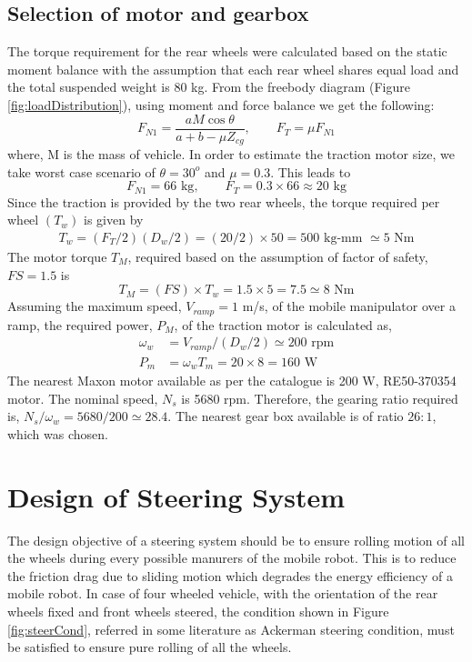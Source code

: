  \subsection {Selection of motor and gearbox}
 The torque requirement for the rear wheels were calculated based on the static moment balance with the assumption that each rear wheel shares equal load and the total suspended weight is 80 kg. From the freebody diagram (Figure   \ref{fig:loadDistribution}), using moment and force balance  we get the following:
\begin{equation}
\label{eqn:t1}
F_{N1}=\frac{a M \cos \theta}{a+b-\mu Z_{cg}} , \quad \quad
F_T=\mu F_{N1}
\end{equation}
where, M is the mass of vehicle.
In order to estimate the traction motor size, we take worst case scenario of $\theta=30^o$ and $\mu =0.3$. This leads to
\begin{equation*}
F_{N1}=66 \text{ kg}, \quad\quad F_T=0.3\times 66 \approx 20 \text{ kg}
\end{equation*}
 Since the traction is provided by the two rear wheels, the torque required per wheel $(T_w)$ is given by
\begin{eqnarray}
T_w=(F_T/2)(D_w/2)= (20/2) \times 50=500 \text{ kg-mm } \simeq 5 \text{ Nm}
\end{eqnarray}
The motor torque $T_M$, required based on the assumption of factor of safety, $FS=1.5$ is
\begin{equation}
T_M=(FS)\times T_w=1.5\times 5 =7.5 \simeq 8 \text{ Nm}
\end{equation}
 Assuming the maximum speed, $V_{ramp}=1$ m/s, of the mobile manipulator over a ramp, the required power, $P_M$, of the traction motor is calculated as,
 \begin{equation}
 \begin{aligned}
\omega_w&=V_{ramp}/(D_w/2) \simeq 200 \text{ rpm}\\
P_m&=\omega_w T_m=20\times 8=160 \text{ W}
 \end{aligned}
 \end{equation}
 The nearest Maxon motor available as per the catalogue \cite{catMaxon} is 200 W,  RE50-370354 motor.  The nominal speed, $N_s$ is 5680 rpm. Therefore, the  gearing  ratio required is, $N_s/\omega_w=5680/200 \simeq 28.4$. The nearest gear box available  is of ratio $26:1$, which was chosen. 

\section{Design of Steering System }
The design objective of a steering system should be to ensure rolling motion of all the  wheels during every possible manurers of the mobile robot. This is  to reduce the friction drag due to sliding motion which degrades the energy efficiency of a mobile robot. In case of four wheeled vehicle, with the orientation of the rear wheels fixed and front wheels steered, the condition   shown in Figure \ref{fig:steerCond},  referred in some literature as Ackerman steering condition, must be satisfied to ensure pure rolling of all the wheels.   


